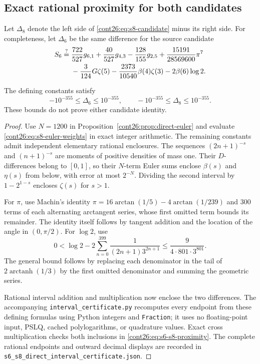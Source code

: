 \subsection{Exact rational proximity for both candidates}
Let $\Delta_8$ denote the left side of \eqref{cont26:eq:s8-candidate} minus
its right side. For completeness, let $\Delta_6$ be the same difference
for the source candidate
\begin{align}
 S_6\stackrel{?}={}&\frac{722}{527}g_{6,1}
  +\frac{40}{527}g_{4,3}-\frac{128}{155}g_{2,5}
  +\frac{15191}{28569600}\pi^7\notag\\
 &-\frac3{124}G\zeta(5)
  -\frac{2373}{10540}\beta(4)\zeta(3)
  -2\beta(6)\log2.
 \label{cont26:eq:s6-recalled}
\end{align}

\begin{proposition}
\label{cont26:prop:s6-s8-proximity}
The defining constants satisfy
\begin{equation}\label{cont26:eq:s6-s8-proximity}
 -10^{-355}\leq\Delta_6\leq10^{-355},\qquad
 -10^{-355}\leq\Delta_8\leq10^{-355}.
\end{equation}
These bounds do not prove either candidate identity.
\end{proposition}

\begin{proof}
Use $N=1200$ in Proposition~\ref{cont26:prop:direct-euler} and evaluate
\eqref{cont26:eq:s8-euler-weights} in exact integer arithmetic.
The remaining constants admit independent elementary rational
enclosures. The sequences $(2n+1)^{-s}$ and $(n+1)^{-s}$ are moments
of positive densities of mass one. Their $D$-differences belong to
$[0,1]$, so their $N$-term Euler sums enclose $\beta(s)$ and
$\eta(s)$ from below, with error at most $2^{-N}$. Dividing the
second interval by $1-2^{1-s}$ encloses $\zeta(s)$ for $s>1$.

For $\pi$, use Machin's identity
$\pi=16\arctan(1/5)-4\arctan(1/239)$ and $300$ terms of each
alternating arctangent series, whose first omitted term bounds its
remainder. The identity itself follows by tangent addition and the
location of the angle in $(0,\pi/2)$. For $\log2$, use
\[
 0<\log2-2\sum_{n=0}^{399}\frac1{(2n+1)3^{2n+1}}
 \leq\frac9{4\cdot801\cdot3^{801}}.
\]
The general bound follows by replacing each denominator in the tail
of $2\operatorname{arctanh}(1/3)$ by the first omitted denominator
and summing the geometric series.

Rational interval addition and multiplication now enclose the two
differences. The accompanying
\nolinkurl{interval_certificate.py} recomputes every endpoint from
these defining formulas using Python integers and \texttt{Fraction};
it uses no floating-point input, PSLQ, cached polylogarithms, or
quadrature values. Exact cross multiplication checks both inclusions
in \eqref{cont26:eq:s6-s8-proximity}. The complete rational endpoints and
outward decimal displays are recorded in
\nolinkurl{s6_s8_direct_interval_certificate.json}.
\end{proof}

